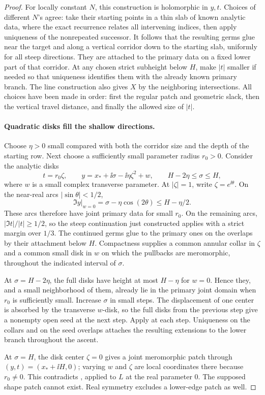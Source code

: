 \begin{proof}
For locally constant \(N\), this construction is
holomorphic in \(y,t\).  Choices of different \(N\)'s
agree: take their starting points in a thin slab of
known analytic data, where the exact recurrence relates
all intervening indices, then apply uniqueness of the
nonrepeated successor.  It follows that the resulting
germs glue near the target and along a vertical corridor
down to the starting slab, uniformly for all steep
directions.  They are attached to the primary data on
a fixed lower part of that corridor.  At any chosen
strict subheight below \(H\), make \(|t|\) smaller if
needed so that uniqueness identifies them with the
already known primary branch.  The line construction
also gives \(X\) by the neighboring intersections.
All choices have been made in order: first the regular
patch and geometric slack, then the vertical travel
distance, and finally the allowed size of \(|t|\).

\paragraph{Quadratic disks fill the shallow directions.}
Choose \(\eta>0\) small compared with both the corridor
size and the depth of the starting row.  Next choose
a sufficiently small parameter radius \(r_0>0\).  Consider
the analytic disks
\begin{equation}
 t=r_0\zeta,\qquad
 y=x_*+\ii\sigma-\ii\eta\zeta^2+w,\qquad
 H-2\eta\le\sigma\le H,
 \label{cont:quadratic-disks}
\end{equation}
where \(w\) is a small complex transverse parameter.
At \(|\zeta|=1\), write \(\zeta=e^{\ii\theta}\).
On the near-real arcs \(|\sin\theta|<1/2\),
\[
 \Im y\big|_{w=0}
   =\sigma-\eta\cos(2\theta)
   \le H-\eta/2.
\]
These arcs therefore have joint primary data for small
\(r_0\).  On the remaining arcs,
\(|\Im t|/|t|\ge1/2\), so the steep continuation just
constructed applies with a strict margin over \(1/3\).
The continued germs glue to the primary ones on the
overlaps by their attachment below \(H\).
Compactness supplies a common annular collar in \(\zeta\)
and a common small disk in \(w\) on which the pullbacks
are meromorphic, throughout the indicated interval of
\(\sigma\).

At \(\sigma=H-2\eta\), the full disks have height at most
\(H-\eta\) for \(w=0\).  Hence they, and a small
neighborhood of them, already lie in the primary joint
domain when \(r_0\) is sufficiently small.
Increase \(\sigma\) in small steps.  The displacement of
one center is absorbed by the transverse \(w\)-disk, so
the full disks from the previous step give a nonempty
open seed at the next step.  Apply
 at each
step.  Uniqueness on the collars and on the seed
overlaps attaches the resulting extensions to the lower
branch throughout the ascent.

At \(\sigma=H\), the disk center \(\zeta=0\) gives a
joint meromorphic patch through
\((y,t)=(x_*+\ii H,0)\); varying \(w\) and \(\zeta\)
are local coordinates there because \(r_0\ne0\).
This contradicts , applied to \(L\)
at the real parameter \(0\).  The supposed shape patch
cannot exist.  Real symmetry excludes a lower-edge
patch as well.
\end{proof}
